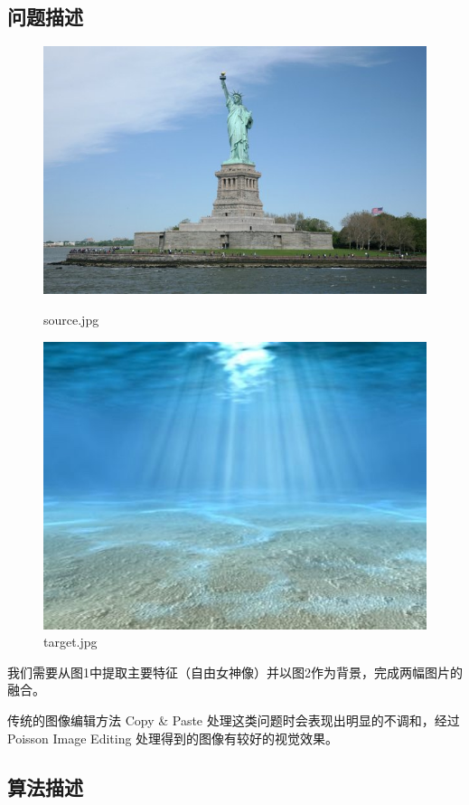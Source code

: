 \documentclass[lang=cn,11pt,a4paper]{elegantpaper}
\begin{document}
\subsection{问题描述}
\begin{figure}[ht]
	\begin{minipage}{0.5\linewidth}
		\centering
		\includegraphics[width=0.927\linewidth]{source.jpg}
		\caption{source.jpg}
	\end{minipage}%
	\begin{minipage}{0.5\linewidth}
		\centering
		\includegraphics[width=0.8 \linewidth]{target.jpg}
		\caption{target.jpg}
	\end{minipage}
\end{figure}

我们需要从图1中提取主要特征（自由女神像）并以图2作为背景，完成两幅图片的融合。

传统的图像编辑方法 Copy \& Paste 处理这类问题时会表现出明显的不调和，经过 Poisson Image Editing 处理得到的图像有较好的视觉效果。

\subsection{算法描述}
\end{document}
